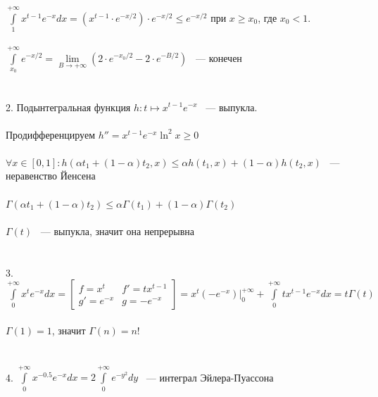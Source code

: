 \documentclass[../main.tex]{subfiles}
\begin{document}
$\int\limits^{+\infty}_1 x^{t - 1} e^{-x} dx = \left( x^{t - 1} \cdot e^{-x / 2} \right) \cdot e^{-x / 2} \leq e^{-x / 2}$ при $x \geq x_0$, где $x_0 < 1$.\\\\
$\int\limits^{+\infty}_{x_0} e^{-x / 2} = \lim\limits_{B \rightarrow +\infty} \left(2 \cdot e^{-x_0 / 2} - 2 \cdot e^{-B / 2} \right)$ ~--- конечен\\\\\\
2. Подынтегральная функция $h : t \mapsto x^{t - 1} e^{-x}$ ~--- выпукла. \\\\
Продифференцируем $h'' = x^{t - 1} e^{-x} \ln^2{x} \geq 0$\\\\
$\forall x \in [0, 1] :  h \left(\alpha t_1 + (1 - \alpha) t_2, x \right) \leq \alpha h(t_1, x) + (1 - \alpha) h(t_2, x)$ ~--- неравенство Йенсена\\\\
$\Gamma(\alpha t_1 + (1 - \alpha) t_2) \leq \alpha \Gamma(t_1) + (1 - \alpha) \Gamma (t_2)$\\\\
$\Gamma(t)$ ~--- выпукла, значит она непрерывна\\\\\\
3. $\int\limits^{+\infty}_0 x^t e^{-x} dx = \begin{bmatrix} f = x^t & f' = t x^{t - 1} \\ g' = e^{-x} & g = -e^{-x} \end{bmatrix} = x^t(-e^{-x}) \bigg|^{+\infty}_0 + \int\limits^{+\infty}_0 t x^{t - 1} e^{-x} dx = t \Gamma(t)$\\\\
$\Gamma(1) = 1$, значит $\Gamma(n) = n!$\\\\\\
4. $\int\limits^{+\infty}_0 x^{-0.5} e^{-x} dx = 2 \int\limits^{+\infty}_0 e^{-y^2} dy$ ~--- интеграл Эйлера-Пуассона

\newpage
\end{document}
